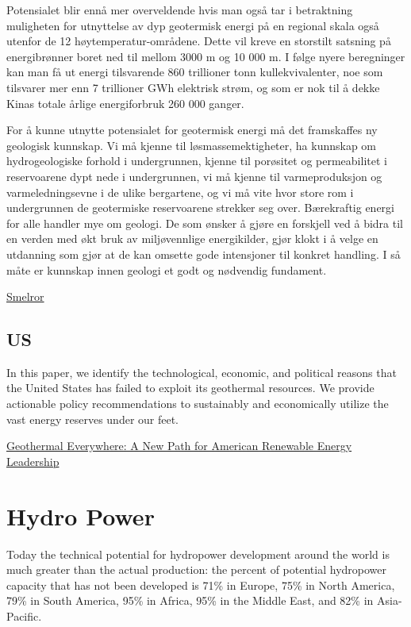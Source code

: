 \documentclass[
]{book}
\begin{document}
Potensialet blir ennå mer overveldende hvis man også tar i betraktning muligheten for utnyttelse av dyp geotermisk energi på en regional skala også utenfor de 12 høytemperatur-områdene. Dette vil kreve en storstilt satsning på energibrønner boret ned til mellom 3000 m og 10 000 m. I følge nyere beregninger kan man få ut energi tilsvarende 860 trillioner tonn kullekvivalenter, noe som tilsvarer mer enn 7 trillioner GWh elektrisk strøm, og som er nok til å dekke Kinas totale årlige energiforbruk 260 000 ganger.

For å kunne utnytte potensialet for geotermisk energi må det framskaffes ny geologisk kunnskap. Vi må kjenne til løsmassemektigheter, ha kunnskap om hydrogeologiske forhold i undergrunnen, kjenne til porøsitet og permeabilitet i reservoarene dypt nede i undergrunnen, vi må kjenne til varmeproduksjon og varmeledningsevne i de ulike bergartene, og vi må vite hvor store rom i undergrunnen de geotermiske reservoarene strekker seg over. Bærekraftig energi for alle handler mye om geologi. De som ønsker å gjøre en forskjell ved å bidra til en verden med økt bruk av miljøvennlige energikilder, gjør klokt i å velge en utdanning som gjør at de kan omsette gode intensjoner til konkret handling. I så måte er kunnskap innen geologi et godt og nødvendig fundament.

\href{https://www.geoforskning.no/blogg/item/baerekraftig-energi-for-alle}{Smelror}

\hypertarget{us}{%
\section{US}\label{us}}

In this paper, we identify the technological, economic, and political reasons that the United States has failed to exploit its geothermal resources. We provide actionable policy recommendations to sustainably and economically utilize the vast energy reserves under our feet.

\href{https://inn\%20ovationfrontier.org/geothermal-everywhere-a-new-path-for-american-renewable-energy-leade\%20rship/}{Geothermal Everywhere: A New Path for American Renewable Energy Leadership}

\hypertarget{hydro-power}{%
\chapter{Hydro Power}\label{hydro-power}}

Today the technical potential for hydropower development around the world is much greater than the actual production: the percent of potential hydropower capacity that has not been developed is 71\% in Europe, 75\% in North America, 79\% in South America, 95\% in Africa, 95\% in the Middle East, and 82\% in Asia-Pacific.
\end{document}
